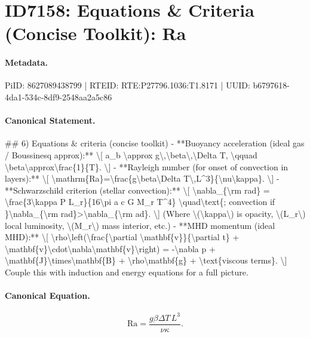 \section*{ID7158: Equations \& Criteria (Concise Toolkit): Ra}
\paragraph{Metadata.}
PiID: 8627089438799 | RTEID: RTE:P27796.1036:T1.8171 | UUID: b6797618-4da1-534c-8df9-2548aa2a5c86

\paragraph{Canonical Statement.}
\#\# 6) Equations \& criteria (concise toolkit) - **Buoyancy acceleration (ideal gas / Boussinesq approx):** \textbackslash{}[ a\_b \textbackslash{}approx g\textbackslash{},\textbackslash{}beta\textbackslash{},\textbackslash{}Delta T, \textbackslash{}qquad \textbackslash{}beta\textbackslash{}approx\textbackslash{}frac\{1\}\{T\}. \textbackslash{}] - **Rayleigh number (for onset of convection in layers):** \textbackslash{}[ \textbackslash{}mathrm\{Ra\}=\textbackslash{}frac\{g\textbackslash{}beta\textbackslash{}Delta T\textbackslash{},L\textasciicircum{}3\}\{\textbackslash{}nu\textbackslash{}kappa\}. \textbackslash{}] - **Schwarzschild criterion (stellar convection):** \textbackslash{}[ \textbackslash{}nabla\_\{\textbackslash{}rm rad\} = \textbackslash{}frac\{3\textbackslash{}kappa P L\_r\}\{16\textbackslash{}pi a c G M\_r T\textasciicircum{}4\} \textbackslash{}quad\textbackslash{}text\{; convection if \}\textbackslash{}nabla\_\{\textbackslash{}rm rad\}>\textbackslash{}nabla\_\{\textbackslash{}rm ad\}. \textbackslash{}] (Where \textbackslash{}(\textbackslash{}kappa\textbackslash{}) is opacity, \textbackslash{}(L\_r\textbackslash{}) local luminosity, \textbackslash{}(M\_r\textbackslash{}) mass interior, etc.) - **MHD momentum (ideal MHD):** \textbackslash{}[ \textbackslash{}rho\textbackslash{}left(\textbackslash{}frac\{\textbackslash{}partial \textbackslash{}mathbf\{v\}\}\{\textbackslash{}partial t\} + \textbackslash{}mathbf\{v\}\textbackslash{}cdot\textbackslash{}nabla\textbackslash{}mathbf\{v\}\textbackslash{}right) = -\textbackslash{}nabla p + \textbackslash{}mathbf\{J\}\textbackslash{}times\textbackslash{}mathbf\{B\} + \textbackslash{}rho\textbackslash{}mathbf\{g\} + \textbackslash{}text\{viscous terms\}. \textbackslash{}] Couple this with induction and energy equations for a full picture.

\paragraph{Canonical Equation.}
\[
\mathrm{Ra}=\frac{g\beta\Delta T\,L^3}{\nu\kappa}.
\]

